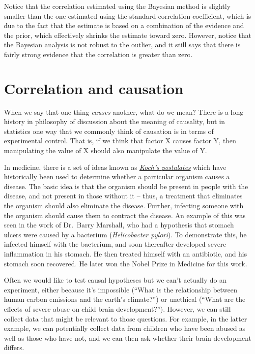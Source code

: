 \documentclass[]{book}
\theoremstyle{definition}
\theoremstyle{definition}
\theoremstyle{definition}
\theoremstyle{remark}
\begin{document}
Notice that the correlation estimated using the Bayesian method is
slightly smaller than the one estimated using the standard correlation
coefficient, which is due to the fact that the estimate is based on a
combination of the evidence and the prior, which effectively shrinks the
estimate toward zero. However, notice that the Bayesian analysis is not
robust to the outlier, and it still says that there is fairly strong
evidence that the correlation is greater than zero.

\section{Correlation and causation}\label{correlation-and-causation}

When we say that one thing \emph{causes} another, what do we mean? There
is a long history in philosophy of discussion about the meaning of
causality, but in statistics one way that we commonly think of causation
is in terms of experimental control. That is, if we think that factor X
causes factor Y, then manipulating the value of X should also manipulate
the value of Y.

In medicine, there is a set of ideas known as
\href{https://en.wikipedia.org/wiki/Koch\%27s_postulates}{\emph{Koch's
postulates}} which have historically been used to determine whether a
particular organism causes a disease. The basic idea is that the
organism should be present in people with the disease, and not present
in those without it -- thus, a treatment that eliminates the organism
should also eliminate the disease. Further, infecting someone with the
organism should cause them to contract the disease. An example of this
was seen in the work of Dr.~Barry Marshall, who had a hypothesis that
stomach ulcers were caused by a bacterium (\emph{Helicobacter pylori}).
To demonstrate this, he infected himself with the bacterium, and soon
thereafter developed severe inflammation in his stomach. He then treated
himself with an antibiotic, and his stomach soon recovered. He later won
the Nobel Prize in Medicine for this work.

Often we would like to test causal hypotheses but we can't actually do
an experiment, either because it's impossible (``What is the
relationship between human carbon emissions and the earth's climate?'')
or unethical (``What are the effects of severe abuse on child brain
development?''). However, we can still collect data that might be
relevant to those questions. For example, in the latter example, we can
potentially collect data from children who have been abused as well as
those who have not, and we can then ask whether their brain development
differs.
\end{document}

